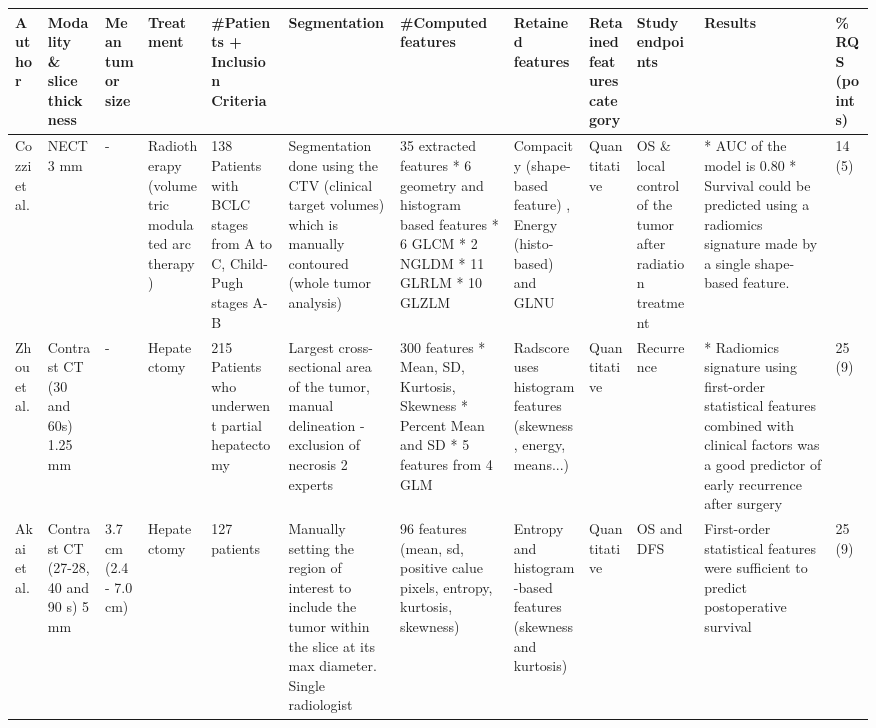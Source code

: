 \renewcommand{\arraystretch}{1}
\begin{landscape}
\small

\begin{longtable}{p{2cm}|p{1.5cm}p{1cm}p{2cm}p{2cm}p{2cm}p{2cm}p{2cm}p{2cm}p{1.5cm}p{2cm}p{1cm}}
\textbf{Author} &\parbox{2cm}{\textbf{Modality \\ \& slice \\thickness}} &\parbox{2cm}{\textbf{Mean \\tumor\\ size}} &\textbf{Treatment} &\textbf{\#Patients + Inclusion Criteria} &\textbf{Segmentation} &\textbf{\#Computed features} &\textbf{Retained features} &\textbf{Retained features category} &\textbf{Study endpoints} &\textbf{Results} &\textbf{\% RQS (points)} \\ \hline \endfirsthead
Cozzi et al. \cite{Cozzi2017} &NECT 3 mm &- &Radiotherapy (volumetric modulated arc therapy) &138 Patients with BCLC stages from A to C, Child-Pugh stages A-B &Segmentation done using the CTV (clinical target volumes) which is manually contoured (whole tumor analysis) &35 extracted features * 6 geometry and histogram based features * 6 GLCM * 2 NGLDM * 11 GLRLM * 10 GLZLM &Compacity (shape-based feature) , Energy (histo-based) and GLNU &Quantitative &OS \& local control of the tumor after radiation treatment &* AUC of the model is 0.80 * Survival could be predicted using a radiomics signature made by a single shape-based feature. &14 (5) \\ 
Zhou et al. \cite{Zhou2017a} &Contrast CT (30 and 60s) 1.25 mm &- &Hepatectomy &215 Patients who underwent partial hepatectomy &Largest cross-sectional area of the tumor, manual delineation - exclusion of necrosis 2 experts &300 features * Mean, SD, Kurtosis, Skewness * Percent Mean and SD * 5 features from 4 GLM &Radscore uses histogram features (skewness, energy, means...) &Quantitative &Recurrence &* Radiomics signature using first-order statistical features combined with clinical factors was a good predictor of early recurrence after surgery &25 (9) \\
Akai et al. \cite{Akai2018} &Contrast CT (27-28, 40 and 90 s) 5 mm &3.7 cm (2.4 - 7.0 cm) &Hepatectomy &127 patients &Manually setting the region of interest to include the tumor within the slice at its max diameter. Single radiologist &96 features (mean, sd, positive calue pixels, entropy, kurtosis, skewness) &Entropy and histogram-based features (skewness and kurtosis) &Quantitative &OS and DFS &First-order statistical features were sufficient to predict postoperative survival &25 (9) \\

\end{longtable}
\end{landscape}
